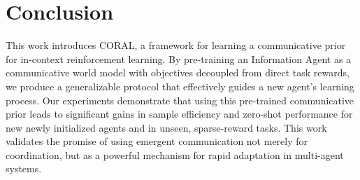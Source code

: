 \documentclass[letterpaper]{article}
\begin{document}
\section{Conclusion}
This work introduces CORAL, a framework for learning a communicative prior for in-context reinforcement learning. By pre-training an Information Agent as a communicative world model with objectives decoupled from direct task rewards, we produce a generalizable protocol that effectively guides a new agent's learning process. Our experiments demonstrate that using this pre-trained communicative prior leads to significant gains in sample efficiency and zero-shot performance for new newly initialized agents and in unseen, sparse-reward tasks. This work validates the promise of using emergent communication not merely for coordination, but as a powerful mechanism for rapid adaptation in multi-agent systems.

\clearpage
\clearpage
\end{document}
